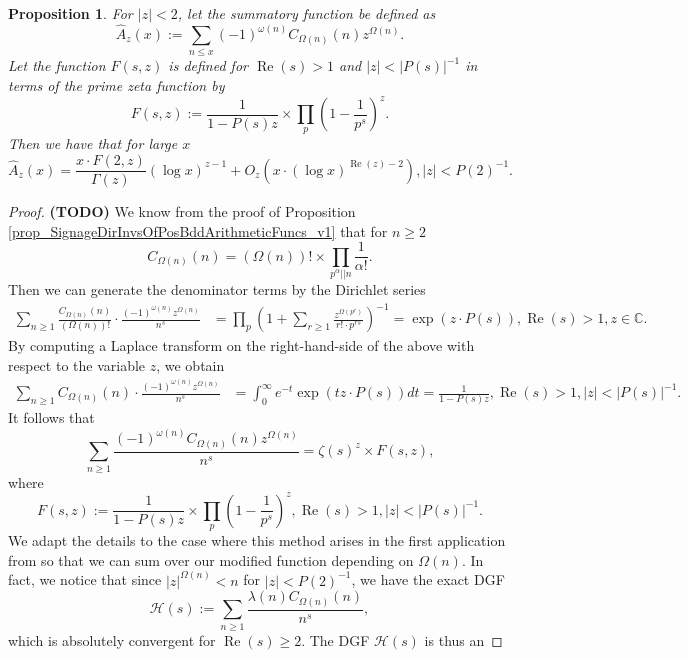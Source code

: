 \documentclass[11pt,reqno,a4letter]{article}
\numberwithin{figure}{section}
\numberwithin{table}{section}
\theoremstyle{plain}
\newtheorem{prop}[theorem]{Proposition}
\numberwithin{theorem}{section}
\theoremstyle{definition}
\renewcommand{\Re}{\operatorname{Re}}
\begin{document}
\begin{prop} 
\label{prop_HatAzx_ModSummatoryFuncExps_RelatedToCkn} 
For $|z| < 2$, let the summatory function be defined as 
\[
\widehat{A}_z(x) := \sum_{n \leq x} (-1)^{\omega(n)} 
     C_{\Omega(n)}(n) z^{\Omega(n)}. 
\]
Let the function $F(s, z)$ is defined for $\Re(s) > 1$ and $|z| < |P(s)|^{-1}$ 
in terms of the prime zeta function by 
\[
F(s, z) := \frac{1}{1-P(s) z} 
     \times \prod_p \left(1 - \frac{1}{p^s}\right)^{z}. 
\]
Then we have that for large $x$ 
\[
\widehat{A}_z(x) = \frac{x \cdot F(2, z)}{\Gamma(z)} (\log x)^{z-1} + 
     O_{z}\left(x \cdot (\log x)^{\Re(z) - 2}\right), |z| < P(2)^{-1}. 
\]
\end{prop} 
\begin{proof} 
\textbf{(TODO)} 
We know from the proof of 
Proposition \ref{prop_SignageDirInvsOfPosBddArithmeticFuncs_v1} that for $n \geq 2$ 
\[
C_{\Omega(n)}(n) = (\Omega(n))! \times \prod_{p^{\alpha}||n} \frac{1}{\alpha!}. 
\]
Then we can generate the denominator terms by the Dirichlet series 
\begin{align*} 
\sum_{n \geq 1} \frac{C_{\Omega(n)}(n)}{(\Omega(n))!} \cdot 
     \frac{(-1)^{\omega(n)} z^{\Omega(n)}}{n^s} & = \prod_p \left(1 + \sum_{r \geq 1} 
     \frac{z^{\Omega(p^r)}}{r! \cdot p^{rs}}\right)^{-1} 
     = \exp\left(z \cdot P(s)\right), \Re(s) > 1, z \in \mathbb{C}. 
\end{align*} 
By computing a Laplace transform on the right-hand-side of the above with 
respect to the variable $z$, we obtain 
\begin{align*} 
\sum_{n \geq 1} C_{\Omega(n)}(n) \cdot \frac{(-1)^{\omega(n)} z^{\Omega(n)}}{n^s} & = 
     \int_0^{\infty} e^{-t} \exp\left(tz \cdot P(s)\right) dt = \frac{1}{1 - P(s) z}, 
     \Re(s) > 1, |z| < |P(s)|^{-1}. 
\end{align*} 
It follows that 
\[
\sum_{n \geq 1} \frac{(-1)^{\omega(n)} C_{\Omega(n)}(n) z^{\Omega(n)}}{n^s} = 
     \zeta(s)^z \times F(s, z), 
\]
where 
\[
F(s, z) := \frac{1}{1-P(s) z} \times \prod_p \left(1 - \frac{1}{p^s}\right)^{z}, 
     \Re(s) > 1, |z| < |P(s)|^{-1}. 
\]
We adapt the details to the case where this method arises in the first 
application from \cite[\S 7.4; Thm.\ 7.18]{MV} 
so that we can sum over our modified function depending on $\Omega(n)$. 
In fact, we notice that since $|z|^{\Omega(n)} < n$ for $|z| < P(2)^{-1}$, we have the 
exact DGF 
\[
\mathcal{H}(s) := \sum_{n \geq 1} \frac{\lambda(n) C_{\Omega(n)}(n)}{n^s}, 
\]
which is absolutely convergent for $\Re(s) \geq 2$. The DGF $\mathcal{H}(s)$ is thus an 

\end{proof}
\end{document}
